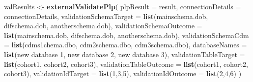 \documentclass[
  11pt]{book}
\newenvironment{Shaded}{\begin{snugshade}}{\end{snugshade}}
\newcommand{\AttributeTok}[1]{\textcolor[rgb]{0.13,0.29,0.53}{#1}}
\newcommand{\DecValTok}[1]{\textcolor[rgb]{0.00,0.00,0.81}{#1}}
\newcommand{\FunctionTok}[1]{\textcolor[rgb]{0.13,0.29,0.53}{\textbf{#1}}}
\newcommand{\NormalTok}[1]{#1}
\newcommand{\OtherTok}[1]{\textcolor[rgb]{0.56,0.35,0.01}{#1}}
\newcommand{\StringTok}[1]{\textcolor[rgb]{0.31,0.60,0.02}{#1}}
\theoremstyle{definition}
\theoremstyle{definition}
\theoremstyle{definition}
\theoremstyle{definition}
\theoremstyle{remark}
\begin{document}
\begin{Shaded}
\begin{Highlighting}[]
\NormalTok{valResults }\OtherTok{\textless{}{-}} \FunctionTok{externalValidatePlp}\NormalTok{(}
    \AttributeTok{plpResult =}\NormalTok{ result,}
    \AttributeTok{connectionDetails =}\NormalTok{ connectionDetails,}
    \AttributeTok{validationSchemaTarget =} \FunctionTok{list}\NormalTok{(}\StringTok{\textquotesingle{}mainschema.dob\textquotesingle{}}\NormalTok{,}
                                \StringTok{\textquotesingle{}difschema.dob\textquotesingle{}}\NormalTok{,}
                                \StringTok{\textquotesingle{}anotherschema.dob\textquotesingle{}}\NormalTok{),}
    \AttributeTok{validationSchemaOutcome =} \FunctionTok{list}\NormalTok{(}\StringTok{\textquotesingle{}mainschema.dob\textquotesingle{}}\NormalTok{,}
                                 \StringTok{\textquotesingle{}difschema.dob\textquotesingle{}}\NormalTok{,}
                                 \StringTok{\textquotesingle{}anotherschema.dob\textquotesingle{}}\NormalTok{),}
    \AttributeTok{validationSchemaCdm =} \FunctionTok{list}\NormalTok{(}\StringTok{\textquotesingle{}cdms1chema.dbo\textquotesingle{}}\NormalTok{,}
                             \StringTok{\textquotesingle{}cdm2schema.dbo\textquotesingle{}}\NormalTok{,}
                             \StringTok{\textquotesingle{}cdm3schema.dbo\textquotesingle{}}\NormalTok{),}
    \AttributeTok{databaseNames =} \FunctionTok{list}\NormalTok{(}\StringTok{\textquotesingle{}new database 1\textquotesingle{}}\NormalTok{,}
                       \StringTok{\textquotesingle{}new database 2\textquotesingle{}}\NormalTok{,}
                       \StringTok{\textquotesingle{}new database 3\textquotesingle{}}\NormalTok{),}
    \AttributeTok{validationTableTarget =} \FunctionTok{list}\NormalTok{(}\StringTok{\textquotesingle{}cohort1\textquotesingle{}}\NormalTok{,}
                               \StringTok{\textquotesingle{}cohort2\textquotesingle{}}\NormalTok{,}
                               \StringTok{\textquotesingle{}cohort3\textquotesingle{}}\NormalTok{),}
    \AttributeTok{validationTableOutcome =} \FunctionTok{list}\NormalTok{(}\StringTok{\textquotesingle{}cohort1\textquotesingle{}}\NormalTok{,}
                                \StringTok{\textquotesingle{}cohort2\textquotesingle{}}\NormalTok{,}
                                \StringTok{\textquotesingle{}cohort3\textquotesingle{}}\NormalTok{),}
    \AttributeTok{validationIdTarget =} \FunctionTok{list}\NormalTok{(}\DecValTok{1}\NormalTok{,}\DecValTok{3}\NormalTok{,}\DecValTok{5}\NormalTok{),}
    \AttributeTok{validationIdOutcome =} \FunctionTok{list}\NormalTok{(}\DecValTok{2}\NormalTok{,}\DecValTok{4}\NormalTok{,}\DecValTok{6}\NormalTok{)}
\NormalTok{)}
\end{Highlighting}
\end{Shaded}
\end{document}
